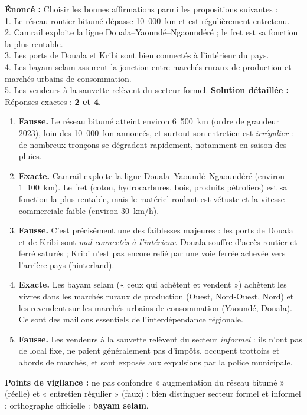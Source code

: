 \documentclass[11pt]{article}
\newcommand{\cle}[1]{{\popxbold\color{popdark}#1}}
\begin{document}
\begin{corrige}
\textbf{Énoncé :} Choisir les bonnes affirmations parmi les propositions suivantes :\\
1. Le réseau routier bitumé dépasse 10~000~km et est régulièrement entretenu.\\
2. Camrail exploite la ligne Douala--Yaoundé--Ngaoundéré ; le fret est sa fonction la plus rentable.\\
3. Les ports de Douala et Kribi sont bien connectés à l'intérieur du pays.\\
4. Les bayam selam assurent la jonction entre marchés ruraux de production et marchés urbains de consommation.\\
5. Les vendeurs à la sauvette relèvent du secteur formel.
\tcblower
\textbf{Solution détaillée :} Réponses exactes : \textbf{2 et 4}.

\begin{enumerate}
    \item \textbf{Fausse.} Le réseau bitumé atteint environ 6~500~km (ordre de grandeur 2023), loin des 10~000~km annoncés, et surtout son entretien est \emph{irrégulier} : de nombreux tronçons se dégradent rapidement, notamment en saison des pluies.
    \item \textbf{Exacte.} Camrail exploite la ligne Douala--Yaoundé--Ngaoundéré (environ 1~100~km). Le fret (coton, hydrocarbures, bois, produits pétroliers) est sa fonction la plus rentable, mais le matériel roulant est vétuste et la vitesse commerciale faible (environ 30~km/h).
    \item \textbf{Fausse.} C'est précisément une des faiblesses majeures : les ports de Douala et de Kribi sont \emph{mal connectés à l'intérieur}. Douala souffre d'accès routier et ferré saturés ; Kribi n'est pas encore relié par une voie ferrée achevée vers l'arrière-pays (hinterland).
    \item \textbf{Exacte.} Les \cle{bayam selam} (« ceux qui achètent et vendent ») achètent les vivres dans les marchés ruraux de production (Ouest, Nord-Ouest, Nord) et les revendent sur les marchés urbains de consommation (Yaoundé, Douala). Ce sont des maillons essentiels de l'interdépendance régionale.
    \item \textbf{Fausse.} Les vendeurs à la sauvette relèvent du secteur \emph{informel} : ils n'ont pas de local fixe, ne paient généralement pas d'impôts, occupent trottoirs et abords de marchés, et sont exposés aux expulsions par la police municipale.
\end{enumerate}

\textbf{Points de vigilance :} ne pas confondre « augmentation du réseau bitumé » (réelle) et « entretien régulier » (faux) ; bien distinguer secteur formel et informel ; orthographe officielle : \textbf{bayam selam}.
\end{corrige}
\end{document}
